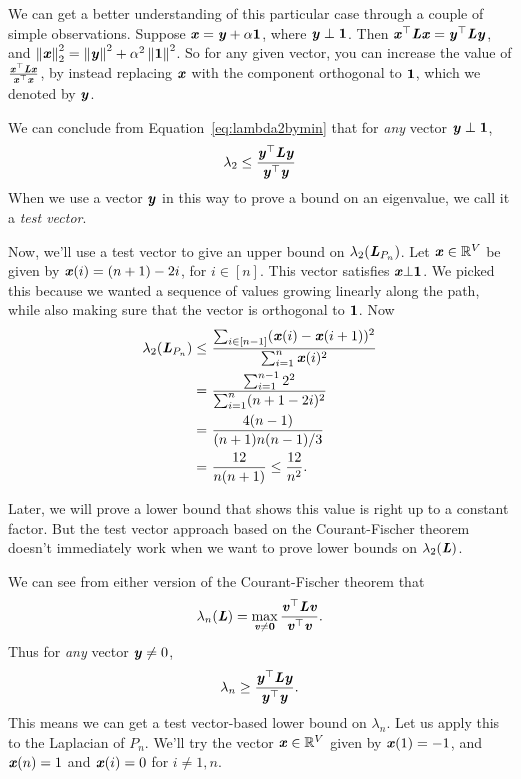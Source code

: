 We can get a better understanding of this particular case through a couple of simple
observations. Suppose $\boldsymbol{\mathit{x}} = \boldsymbol{\mathit{y}} + \alpha \boldsymbol{1}$, where $\boldsymbol{\mathit{y}} \perp
\boldsymbol{1}$.
Then $\boldsymbol{\mathit{x}}^{\top} \boldsymbol{\mathit{L}} \boldsymbol{\mathit{x}} = \boldsymbol{\mathit{y}}^{\top} \boldsymbol{\mathit{L}} \boldsymbol{\mathit{y}}$, and $\left\| \boldsymbol{\mathit{x}} \right\|_2^2 =
\left\| \boldsymbol{\mathit{y}} \right\|^2 + \alpha^2 \left\| \boldsymbol{1} \right\|^2$.
So for any given vector, you can increase the value of $\frac{
  \boldsymbol{\mathit{x}}^\top \boldsymbol{\mathit{L}} \boldsymbol{\mathit{x}}}{ \boldsymbol{\mathit{x}}^\top \boldsymbol{\mathit{x}}}$, by instead replacing $\boldsymbol{\mathit{x}}$ with
the component orthogonal to $\boldsymbol{1}$, which we denoted by $\boldsymbol{\mathit{y}}$.

We can conclude from Equation~\eqref{eq:lambda2bymin} that for \emph{any} vector $\boldsymbol{\mathit{y}} \perp \boldsymbol{1}$,
\begin{align*}
\lambda_2 \leq \frac{ \boldsymbol{\mathit{y}}^\top \boldsymbol{\mathit{L}} \boldsymbol{\mathit{y}}}{ \boldsymbol{\mathit{y}}^\top \boldsymbol{\mathit{y}}}
\end{align*}
When we use a vector $\boldsymbol{\mathit{y}}$ in this way to prove a bound on an eigenvalue, we call it a \emph{test vector}.

Now, we'll use a test vector to give an upper bound on $\lambda_2(\boldsymbol{\mathit{L}}_{P_n})$.
Let $\boldsymbol{\mathit{x}} \in \mathbb{R}^V$ be given by $\boldsymbol{\mathit{x}} ( i ) = ( n + 1 ) - 2 i$, for $i
\in [n]$. This vector satisfies $\boldsymbol{\mathit{x}} \bot \boldsymbol{1}$.
We picked this because we wanted a sequence of values growing linearly along
the path, while also making sure that the vector is orthogonal to
$\boldsymbol{1}$.
Now
\begin{align*}
\lambda_2(\boldsymbol{\mathit{L}}_{P_n})
\leq & ~ \frac{ \sum_{i \in [n-1]} ( \boldsymbol{\mathit{x}}(i) - \boldsymbol{\mathit{x}}(i+1) )^2  }{ \sum_{i=1}^n \boldsymbol{\mathit{x}}(i)^2 } \\
= & ~ \frac{ \sum_{i=1}^{n-1} 2^2 }{ \sum_{i=1}^n ( n + 1 - 2 i )^2 } \\
= & ~ \frac{ 4 ( n - 1 ) }{ ( n + 1 ) n ( n - 1 ) / 3 } \\
= & ~ \frac{ 12 } { n ( n + 1 ) } \leq \frac{ 12 } { n^2 }.
\end{align*}

Later, we will prove a lower bound that shows this value is right up
to a constant factor.
But the test vector approach based on the Courant-Fischer theorem
doesn't immediately work
when we want to prove lower bounds on $\lambda_2(\boldsymbol{\mathit{L}})$.

We can see from either version of the Courant-Fischer theorem that
\begin{align}
  \label{eq:lambdanbymax}
\lambda_n(\boldsymbol{\mathit{L}}) = \max_{ \substack{ \boldsymbol{\mathit{v}} \neq \boldsymbol{0}} } \frac{ \boldsymbol{\mathit{v}}^\top \boldsymbol{\mathit{L}} \boldsymbol{\mathit{v}}}{ \boldsymbol{\mathit{v}}^\top \boldsymbol{\mathit{v}}}.
\end{align}
Thus for \emph{any} vector $\boldsymbol{\mathit{y}} \neq 0$,
\begin{align*}
\lambda_n \geq \frac{ \boldsymbol{\mathit{y}}^\top \boldsymbol{\mathit{L}} \boldsymbol{\mathit{y}}}{ \boldsymbol{\mathit{y}}^\top \boldsymbol{\mathit{y}}}.
\end{align*}
This means we can get a test vector-based lower bound on $\lambda_n$.
Let us apply this to the Laplacian of $P_n$.
We'll try the vector $\boldsymbol{\mathit{x}} \in \mathbb{R}^V$ given by $\boldsymbol{\mathit{x}} ( 1 ) = -1$,
and $\boldsymbol{\mathit{x}}(n) = 1$ and $\boldsymbol{\mathit{x}}(i) = 0$ for $i \neq 1,n$.

